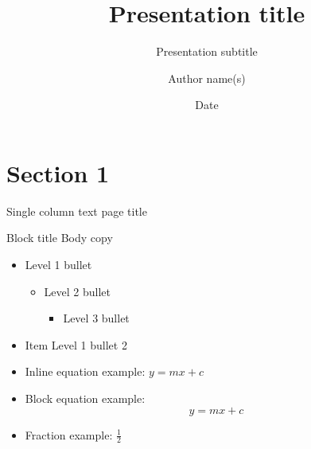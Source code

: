\documentclass[t]{beamer}
\title{Presentation title}
\subtitle{Presentation subtitle}
\date{Date}
\author{Author name(s)}
\begin{document}
\begin{frame}
	\titlepage
\end{frame}

\begin{frame}
	\imprintpage
\end{frame}

\section{Section 1}

\begin{frame}{Single column text page title}
	\begin{block}{Block title}
  		Body copy
  		\begin{itemize}    
  			\item Level 1 bullet
			\begin{itemize}
					\item Level 2 bullet
					\begin{itemize}
						\item Level 3 bullet
					\end{itemize}
			\end{itemize}
  			\item Item Level 1 bullet 2
			\item Inline equation example: $ y=mx+c$
			\item Block equation example: \begin{equation} y=mx+c \end{equation}
			\item Fraction example: $\frac{1}{2}$
  		\end{itemize}    
	\end{block}
\end{frame}
\end{document}
